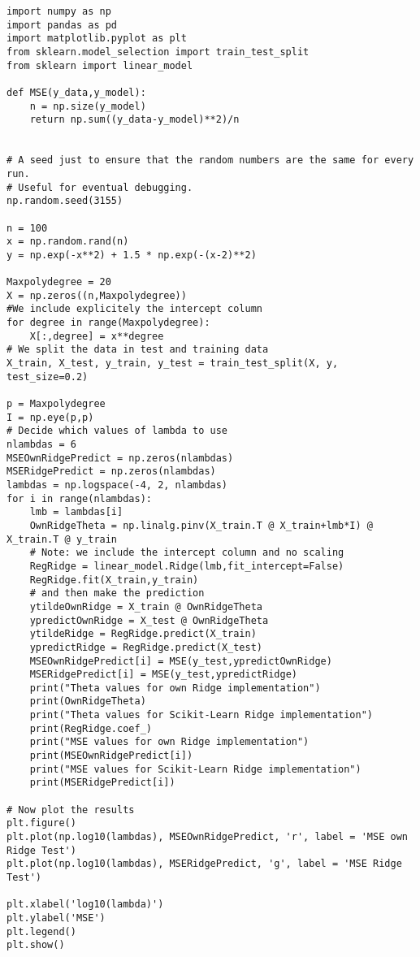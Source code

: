 \documentclass[%
oneside,                 %
final,                   %
10pt]{article}
\begin{document}
\begin{verbatim}
import numpy as np
import pandas as pd
import matplotlib.pyplot as plt
from sklearn.model_selection import train_test_split
from sklearn import linear_model

def MSE(y_data,y_model):
    n = np.size(y_model)
    return np.sum((y_data-y_model)**2)/n


# A seed just to ensure that the random numbers are the same for every run.
# Useful for eventual debugging.
np.random.seed(3155)

n = 100
x = np.random.rand(n)
y = np.exp(-x**2) + 1.5 * np.exp(-(x-2)**2)

Maxpolydegree = 20
X = np.zeros((n,Maxpolydegree))
#We include explicitely the intercept column
for degree in range(Maxpolydegree):
    X[:,degree] = x**degree
# We split the data in test and training data
X_train, X_test, y_train, y_test = train_test_split(X, y, test_size=0.2)

p = Maxpolydegree
I = np.eye(p,p)
# Decide which values of lambda to use
nlambdas = 6
MSEOwnRidgePredict = np.zeros(nlambdas)
MSERidgePredict = np.zeros(nlambdas)
lambdas = np.logspace(-4, 2, nlambdas)
for i in range(nlambdas):
    lmb = lambdas[i]
    OwnRidgeTheta = np.linalg.pinv(X_train.T @ X_train+lmb*I) @ X_train.T @ y_train
    # Note: we include the intercept column and no scaling
    RegRidge = linear_model.Ridge(lmb,fit_intercept=False)
    RegRidge.fit(X_train,y_train)
    # and then make the prediction
    ytildeOwnRidge = X_train @ OwnRidgeTheta
    ypredictOwnRidge = X_test @ OwnRidgeTheta
    ytildeRidge = RegRidge.predict(X_train)
    ypredictRidge = RegRidge.predict(X_test)
    MSEOwnRidgePredict[i] = MSE(y_test,ypredictOwnRidge)
    MSERidgePredict[i] = MSE(y_test,ypredictRidge)
    print("Theta values for own Ridge implementation")
    print(OwnRidgeTheta)
    print("Theta values for Scikit-Learn Ridge implementation")
    print(RegRidge.coef_)
    print("MSE values for own Ridge implementation")
    print(MSEOwnRidgePredict[i])
    print("MSE values for Scikit-Learn Ridge implementation")
    print(MSERidgePredict[i])

# Now plot the results
plt.figure()
plt.plot(np.log10(lambdas), MSEOwnRidgePredict, 'r', label = 'MSE own Ridge Test')
plt.plot(np.log10(lambdas), MSERidgePredict, 'g', label = 'MSE Ridge Test')

plt.xlabel('log10(lambda)')
plt.ylabel('MSE')
plt.legend()
plt.show()


\end{verbatim}
\end{document}
